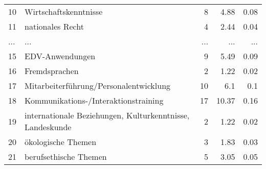 \begin{longtable}{lXrrr}
        10 & \multicolumn{1}{X}{Wirtschaftskenntnisse} & %
          \num{8} &
          \num[round-mode=places,round-precision=2]{4.88} &
          \num[round-mode=places,round-precision=2]{0.08} \\
        11 & \multicolumn{1}{X}{nationales Recht} & %
          \num{4} &
          \num[round-mode=places,round-precision=2]{2.44} &
          \num[round-mode=places,round-precision=2]{0.04} \\
       ... & ... & ... & ... & ... \\
        15 & \multicolumn{1}{X}{EDV-Anwendungen} & %
          \num{9} &
          \num[round-mode=places,round-precision=2]{5.49} &
          \num[round-mode=places,round-precision=2]{0.09} \\

        16 & \multicolumn{1}{X}{Fremdsprachen} & %
          \num{2} &
          \num[round-mode=places,round-precision=2]{1.22} &
          \num[round-mode=places,round-precision=2]{0.02} \\

        17 & \multicolumn{1}{X}{Mitarbeiterführung/Personalentwicklung} & %
          \num{10} &
          \num[round-mode=places,round-precision=2]{6.1} &
          \num[round-mode=places,round-precision=2]{0.1} \\

        18 & \multicolumn{1}{X}{Kommunikations-/Interaktionstraining} & %
          \num{17} &
          \num[round-mode=places,round-precision=2]{10.37} &
          \num[round-mode=places,round-precision=2]{0.16} \\

        19 & \multicolumn{1}{X}{internationale Beziehungen, Kulturkenntnisse, Landeskunde} & %
          \num{2} &
          \num[round-mode=places,round-precision=2]{1.22} &
          \num[round-mode=places,round-precision=2]{0.02} \\

        20 & \multicolumn{1}{X}{ökologische Themen} & %
          \num{3} &
          \num[round-mode=places,round-precision=2]{1.83} &
          \num[round-mode=places,round-precision=2]{0.03} \\

        21 & \multicolumn{1}{X}{berufsethische Themen} & %
          \num{5} &
          \num[round-mode=places,round-precision=2]{3.05} &
          \num[round-mode=places,round-precision=2]{0.05} \\


\end{longtable}
